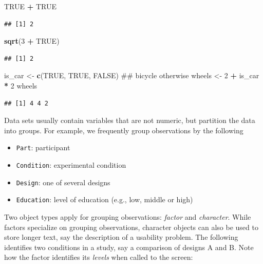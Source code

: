 \documentclass[]{svmono}
\newenvironment{Shaded}{\begin{snugshade}}{\end{snugshade}}
\newcommand{\KeywordTok}[1]{\textcolor[rgb]{0.13,0.29,0.53}{\textbf{#1}}}
\newcommand{\DecValTok}[1]{\textcolor[rgb]{0.00,0.00,0.81}{#1}}
\newcommand{\StringTok}[1]{\textcolor[rgb]{0.31,0.60,0.02}{#1}}
\newcommand{\OtherTok}[1]{\textcolor[rgb]{0.56,0.35,0.01}{#1}}
\newcommand{\OperatorTok}[1]{\textcolor[rgb]{0.81,0.36,0.00}{\textbf{#1}}}
\newcommand{\NormalTok}[1]{#1}
\providecommand{\tightlist}{%
  \setlength{\itemsep}{0pt}\setlength{\parskip}{0pt}}
\begin{document}
\begin{Shaded}
\begin{Highlighting}[]
\OtherTok{TRUE} \OperatorTok{+}\StringTok{ }\OtherTok{TRUE}
\end{Highlighting}
\end{Shaded}

\begin{verbatim}
## [1] 2
\end{verbatim}

\begin{Shaded}
\begin{Highlighting}[]
\KeywordTok{sqrt}\NormalTok{(}\DecValTok{3} \OperatorTok{+}\StringTok{ }\OtherTok{TRUE}\NormalTok{)}
\end{Highlighting}
\end{Shaded}

\begin{verbatim}
## [1] 2
\end{verbatim}

\begin{Shaded}
\begin{Highlighting}[]
\NormalTok{is_car <-}\StringTok{ }\KeywordTok{c}\NormalTok{(}\OtherTok{TRUE}\NormalTok{, }\OtherTok{TRUE}\NormalTok{, }\OtherTok{FALSE}\NormalTok{) ## bicycle otherwise}
\NormalTok{wheels <-}\StringTok{ }\DecValTok{2} \OperatorTok{+}\StringTok{ }\NormalTok{is_car }\OperatorTok{*}\StringTok{ }\DecValTok{2}
\NormalTok{wheels}
\end{Highlighting}
\end{Shaded}

\begin{verbatim}
## [1] 4 4 2
\end{verbatim}

Data sets usually contain variables that are not numeric, but partition
the data into groups. For example, we frequently group observations by
the following

\begin{itemize}
\tightlist
\item
  \texttt{Part}: participant
\item
  \texttt{Condition}: experimental condition
\item
  \texttt{Design}: one of several designs
\item
  \texttt{Education}: level of education (e.g., low, middle or high)
\end{itemize}

Two object types apply for grouping observations: \emph{factor} and
\emph{character}. While factors specialize on grouping observations,
character objects can also be used to store longer text, say the
description of a usability problem. The following identifies two
conditions in a study, say a comparison of designs A and B. Note how the
factor identifies its \emph{levels} when called to the screen:
\end{document}
